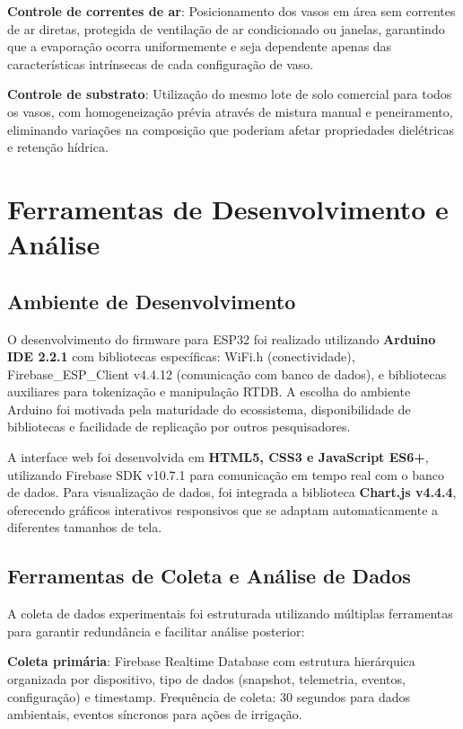 \textbf{Controle de correntes de ar}: Posicionamento dos vasos em área sem correntes de ar diretas, protegida de ventilação de ar condicionado ou janelas, garantindo que a evaporação ocorra uniformemente e seja dependente apenas das características intrínsecas de cada configuração de vaso.

\textbf{Controle de substrato}: Utilização do mesmo lote de solo comercial para todos os vasos, com homogeneização prévia através de mistura manual e peneiramento, eliminando variações na composição que poderiam afetar propriedades dielétricas e retenção hídrica.

\section{Ferramentas de Desenvolvimento e Análise}

\subsection{Ambiente de Desenvolvimento}

O desenvolvimento do firmware para ESP32 foi realizado utilizando \textbf{Arduino IDE 2.2.1} com bibliotecas específicas: WiFi.h (conectividade), Firebase\_ESP\_Client v4.4.12 (comunicação com banco de dados), e bibliotecas auxiliares para tokenização e manipulação RTDB. A escolha do ambiente Arduino foi motivada pela maturidade do ecossistema, disponibilidade de bibliotecas e facilidade de replicação por outros pesquisadores.

A interface web foi desenvolvida em \textbf{HTML5, CSS3 e JavaScript ES6+}, utilizando Firebase SDK v10.7.1 para comunicação em tempo real com o banco de dados. Para visualização de dados, foi integrada a biblioteca \textbf{Chart.js v4.4.4}, oferecendo gráficos interativos responsivos que se adaptam automaticamente a diferentes tamanhos de tela.

\subsection{Ferramentas de Coleta e Análise de Dados}

A coleta de dados experimentais foi estruturada utilizando múltiplas ferramentas para garantir redundância e facilitar análise posterior:

\textbf{Coleta primária}: Firebase Realtime Database com estrutura hierárquica organizada por dispositivo, tipo de dados (snapshot, telemetria, eventos, configuração) e timestamp. Frequência de coleta: 30 segundos para dados ambientais, eventos síncronos para ações de irrigação.

